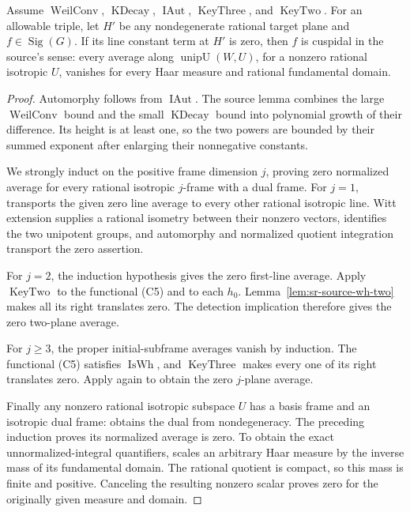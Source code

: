 \begin{srproposition}
\label{prop:sr-source-line-cusp}
Assume \(\operatorname{WeilConv}\),
\(\operatorname{KDecay}\), \(\operatorname{IAut}\),
\(\operatorname{KeyThree}\), and \(\operatorname{KeyTwo}\).
For an allowable triple, let \(H'\) be any nondegenerate
rational target plane and \(f\in\operatorname{Sig}(G)\).
If its line constant term at \(H'\) is zero, then \(f\)
is cuspidal in the source's sense: every average along
\(\operatorname{unipU}(W,U)\), for a nonzero rational
isotropic \(U\), vanishes for every Haar measure and
rational fundamental domain.
\end{srproposition}

\begin{proof}
Automorphy follows from \(\operatorname{IAut}\).
The source lemma  combines the large
\(\operatorname{WeilConv}\) bound and the small
\(\operatorname{KDecay}\) bound into polynomial growth
of their difference. Its height is at least one, so the
two powers are bounded by their summed exponent after
enlarging their nonnegative constants.

We strongly induct on the positive frame dimension \(j\),
proving zero normalized average for every rational
isotropic \(j\)-frame with a dual frame.
For \(j=1\),  transports the given
zero line average to every other rational isotropic line.
Witt extension supplies a rational isometry between their
nonzero vectors,  identifies the two
unipotent groups, and automorphy and normalized quotient
integration transport the zero assertion.

For \(j=2\), the induction hypothesis gives the zero first-line
average. Apply \(\operatorname{KeyTwo}\) to the functional
(C5) and to each \(h_0\).
Lemma~\ref{lem:sr-source-wh-two} makes all its right translates
zero. The detection implication  therefore
gives the zero two-plane average.

For \(j\ge3\), the proper initial-subframe averages vanish by
induction. The functional (C5) satisfies
\(\operatorname{IsWh}\), and \(\operatorname{KeyThree}\)
makes every one of its right translates zero.
Apply  again to obtain the zero \(j\)-plane
average.

Finally any nonzero rational isotropic subspace \(U\)
has a basis frame and an isotropic dual frame:
 obtains the dual from nondegeneracy.
The preceding induction proves its normalized average is zero.
To obtain the exact unnormalized-integral quantifiers,
 scales an arbitrary Haar measure by the
inverse mass of its fundamental domain. The rational quotient
is compact, so this mass is finite and positive.
Canceling the resulting nonzero scalar proves zero for
the originally given measure and domain.
\end{proof}


